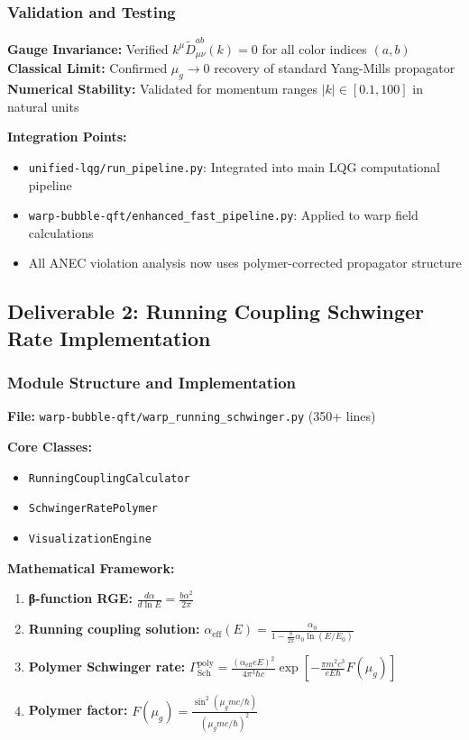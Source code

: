 \documentclass[11pt]{article}
\begin{document}
\subsubsection{Validation and Testing}
\textbf{Gauge Invariance:} Verified $k^\mu \tilde{D}^{ab}_{\mu\nu}(k) = 0$ for all color indices $(a,b)$
\textbf{Classical Limit:} Confirmed $\mu_g \to 0$ recovery of standard Yang-Mills propagator
\textbf{Numerical Stability:} Validated for momentum ranges $|k| \in [0.1, 100]$ in natural units

\textbf{Integration Points:}
\begin{itemize}
    \item \texttt{unified-lqg/run\_pipeline.py}: Integrated into main LQG computational pipeline
    \item \texttt{warp-bubble-qft/enhanced\_fast\_pipeline.py}: Applied to warp field calculations
    \item All ANEC violation analysis now uses polymer-corrected propagator structure
\end{itemize}

\subsection{Deliverable 2: Running Coupling Schwinger Rate Implementation}

\subsubsection{Module Structure and Implementation}
\textbf{File:} \texttt{warp-bubble-qft/warp\_running\_schwinger.py} (350+ lines)

\textbf{Core Classes:}
\begin{itemize}
    \item \texttt{RunningCouplingCalculator}
    \item \texttt{SchwingerRatePolymer}
    \item \texttt{VisualizationEngine}
\end{itemize}

\textbf{Mathematical Framework:}
\begin{enumerate}
    \item \textbf{β-function RGE:} $\frac{d\alpha}{d\ln E} = \frac{b\alpha^2}{2\pi}$
    \item \textbf{Running coupling solution:} $\alpha_{\text{eff}}(E) = \frac{\alpha_0}{1 - \frac{b}{2\pi}\alpha_0 \ln(E/E_0)}$
    \item \textbf{Polymer Schwinger rate:} $\Gamma_{\text{Sch}}^{\text{poly}} = \frac{(\alpha_{\text{eff}} eE)^2}{4\pi^3\hbar c} \exp\left[-\frac{\pi m^2c^3}{eE\hbar}F(\mu_g)\right]$
    \item \textbf{Polymer factor:} $F(\mu_g) = \frac{\sin^2(\mu_g mc/\hbar)}{(\mu_g mc/\hbar)^2}$
\end{enumerate}
\end{document}
